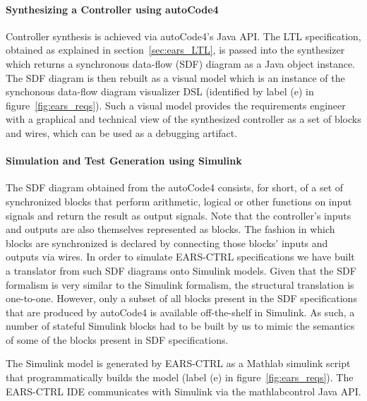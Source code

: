 \paragraph{\textbf{Synthesizing a Controller using \textsf{autoCode4}}\\}
\hspace{-.2cm}Controller synthesis is achieved via \textsf{autoCode4}'s Java
API. The LTL specification, obtained as explained in section~\ref{sec:ears_LTL},
is passed into the synthesizer which returns a synchronous data-flow (SDF) diagram as a Java
object instance. The SDF diagram is then rebuilt as a visual model
which is an instance of the synchonous data-flow diagram visualizer DSL
(identified by label (\textsf{e}) in figure~\ref{fig:ears_reqs}). Such a visual
model provides the requirements engineer with a graphical and technical view of
the synthesized controller as a set of blocks and wires, which can be used as a
debugging artifact.\vspace{-.2cm}
\paragraph{\textbf{Simulation and Test Generation using Simulink}\\}
\hspace{-.2cm}The SDF diagram obtained from the \textsf{autoCode4} consists, for
short, of a set of synchronized blocks that perform arithmetic, logical or other functions
on input signals and return the result as output signals. Note that the
controller's inputs and outputs are also themselves represented as blocks. The
fashion in which blocks are synchronized is declared by connecting those blocks'
inputs and outputs via wires. In order to simulate \textsf{EARS-CTRL}
specifications we have built a translator from such SDF diagrams onto Simulink
models. Given that the SDF formalism is very similar to the Simulink formalism,
the structural translation is  one-to-one. However, only a subset of all blocks
present in the SDF specifications that are produced by \textsf{autoCode4} is
available off-the-shelf in Simulink. As such, a number of stateful Simulink
blocks had to be built by us to mimic the semantics of some of the blocks
present in SDF specifications.

The Simulink model is generated by \textsf{EARS-CTRL} as a Mathlab simulink
script that programmatically builds the model (label (\textsf{e}) in
figure~\ref{fig:ears_reqs}). The \textsf{EARS-CTRL} IDE
communicates with Simulink via the \textsf{mathlabcontrol}\cite{mathlabcontrol}
Java API.\vspace{-.5cm}
